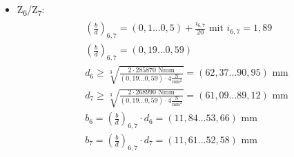 \begin{itemize}
\begin{align*}
\end{align*}
\item {Z\textsubscript{6}/Z\textsubscript{7}:}
\begin{align*}
	& \left(\frac{b}{d} \right) _{6,7} = (0,1...0,5) + \frac{i_{6,7}}{20} \text{ mit } i_{6,7} =  1,89 \\
	&\left(\frac{b}{d} \right) _{6,7}=  (0,19...0,59) \\
	&d_6 \ge \sqrt[3]{\frac{2 \cdot 285870 \text{ Nmm}}{(0,19...0,59) \cdot  4 \frac{\text{N}}{\text{mm}^2}}}= (62,37...90,95) \text{ mm}\\
	&d_7 \ge \sqrt[3]{\frac{2 \cdot 268990 \text{ Nmm}}{(0,19...0,59) \cdot  4 \frac{\text{N}}{\text{mm}^2}}}= (61,09...89,12) \text{ mm}  \\
	&b_6= \left(\frac{b}{d} \right) _{6,7}  \cdot d_6 = (11,84...53,66) \text{ mm}  \\
	&b_7= \left(\frac{b}{d} \right) _{6,7}  \cdot d_7 = (11,61...52,58) \text{ mm}  \\
\end{align*}
\end{itemize}
